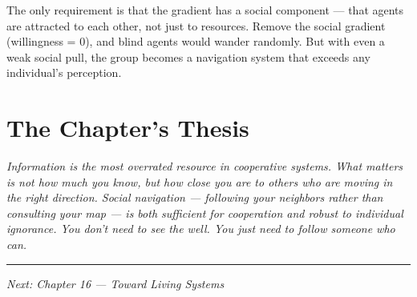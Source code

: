 The only requirement is that the gradient has a social component --- that agents are attracted to each other, not just to resources. Remove the social gradient (willingness = 0), and blind agents would wander randomly. But with even a weak social pull, the group becomes a navigation system that exceeds any individual's perception.

\section{The Chapter's Thesis}\label{the-chapters-thesis}

\emph{Information is the most overrated resource in cooperative systems. What matters is not how much you know, but how close you are to others who are moving in the right direction. Social navigation --- following your neighbors rather than consulting your map --- is both sufficient for cooperation and robust to individual ignorance. You don't need to see the well. You just need to follow someone who can.}

\begin{center}\rule{0.5\linewidth}{0.5pt}\end{center}

\emph{Next: Chapter 16 --- Toward Living Systems}
